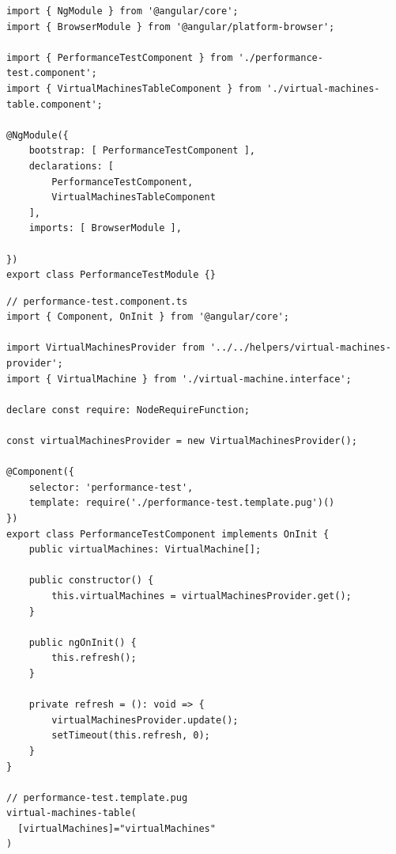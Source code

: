 \documentclass[polish, twoside, 12pt]{mwart}
\begin{document}
\begin{lstlisting}[caption=Główny moduł]
import { NgModule } from '@angular/core';
import { BrowserModule } from '@angular/platform-browser';

import { PerformanceTestComponent } from './performance-test.component';
import { VirtualMachinesTableComponent } from './virtual-machines-table.component';

@NgModule({
    bootstrap: [ PerformanceTestComponent ],
    declarations: [
        PerformanceTestComponent,
        VirtualMachinesTableComponent
    ],
    imports: [ BrowserModule ],

})
export class PerformanceTestModule {}
\end{lstlisting}

\begin{lstlisting}[caption=Główny komponent]
// performance-test.component.ts
import { Component, OnInit } from '@angular/core';

import VirtualMachinesProvider from '../../helpers/virtual-machines-provider';
import { VirtualMachine } from './virtual-machine.interface';

declare const require: NodeRequireFunction;

const virtualMachinesProvider = new VirtualMachinesProvider();

@Component({
    selector: 'performance-test',
    template: require('./performance-test.template.pug')()
})
export class PerformanceTestComponent implements OnInit {
    public virtualMachines: VirtualMachine[];

    public constructor() {
        this.virtualMachines = virtualMachinesProvider.get();
    }

    public ngOnInit() {
        this.refresh();
    }

    private refresh = (): void => {
        virtualMachinesProvider.update();
        setTimeout(this.refresh, 0);
    }
}

// performance-test.template.pug
virtual-machines-table(
  [virtualMachines]="virtualMachines"
)
\end{lstlisting}
\end{document}
